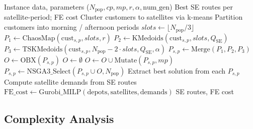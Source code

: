 \documentclass[11pt, a4paper]{article}
\newcommand{\QSE}{Q_{\mathrm{SE}}}
\numberwithin{equation}{section}
\begin{document}
\begin{algorithm}[ht]
\caption{INSGA3 for 2E-MD-MD-MP-CVRP-SPD}
\label{alg:insga3}
\begin{algorithmic}[1]
\Require Instance data, parameters ($N_{\mathrm{pop}},cp,mp,r,\alpha,
         \mathrm{num\_gen}$)
\Ensure Best SE routes per satellite-period; FE cost
\State Cluster customers to satellites via k-means
\State Partition customers into morning / afternoon periods
  \State $\mathit{slots}\leftarrow\lfloor N_{\mathrm{pop}}/3\rfloor$
  \State $P_1\leftarrow\mathrm{ChaosMap}(\mathrm{cust}_{s,p},\mathit{slots},r)$
  \State $P_2\leftarrow\mathrm{KMedoids}(\mathrm{cust}_{s,p},\mathit{slots},\QSE)$
  \State $P_3\leftarrow\mathrm{TSKMedoids}(\mathrm{cust}_{s,p},
         N_{\mathrm{pop}}-2\cdot\mathit{slots},\QSE,\alpha)$
  \State $P_{s,p}\leftarrow\mathrm{Merge}(P_1,P_2,P_3)$
\EndFor
{}
      \State $O\leftarrow\mathrm{OBX}(P_{s,p})$
    \Else
      \State $O\leftarrow\emptyset$
    \EndIf
    \State $O\leftarrow O\cup\mathrm{Mutate}(P_{s,p},mp)$
    \State $P_{s,p}\leftarrow\mathrm{NSGA3\_Select}(P_{s,p}\cup O,N_{\mathrm{pop}})$
  \EndFor
\EndFor
\State Extract best solution from each $P_{s,p}$
\State Compute satellite demands from SE routes
\State $\mathrm{FE\_cost}\leftarrow
       \mathrm{Gurobi\_MILP}(\mathrm{depots},\mathrm{satellites},\mathrm{demands})$
\State \Return SE routes, FE cost
\end{algorithmic}
\end{algorithm}

\subsection{Complexity Analysis}
\label{sec:complexity}
\end{document}
